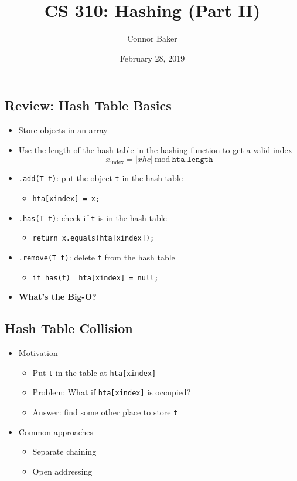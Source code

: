 \documentclass[10pt]{article}
\title{CS 310: Hashing (Part II)}
\author{Connor Baker}
\date{February 28, 2019}
\begin{document}
\maketitle

\subsection*{Review: Hash Table Basics}
\begin{itemize}
    \item Store objects in an array
    \item Use the length of the hash table in the hashing function to get a valid index
    $$ x_\text{index} = |xhc|\ \text{mod}\ \texttt{hta.length}$$
    \item \texttt{.add(T t)}: put the object \texttt{t} in the hash table
    \begin{itemize}
        \item \texttt{hta[xindex] = x;}
    \end{itemize}
    \item \texttt{.has(T t)}: check if \texttt{t} is in the hash table
    \begin{itemize}
        \item \texttt{return x.equals(hta[xindex]);}
    \end{itemize}
    \item \texttt{.remove(T t)}: delete \texttt{t} from the hash table
    \begin{itemize}
        \item \texttt{if has(t) { hta[xindex] = null; }}
    \end{itemize}
    \item \textbf{What's the Big-O?}
\end{itemize}

\subsection*{Hash Table Collision}
\begin{itemize}
    \item Motivation
    \begin{itemize}
        \item Put \texttt{t} in the table at \texttt{hta[xindex]}
        \item Problem: What if \texttt{hta[xindex]} is occupied?
        \item Answer: find some other place to store \texttt{t}
    \end{itemize}
    \item Common approaches
    \begin{itemize}
        \item Separate chaining
        \item Open addressing
    \end{itemize}
\end{itemize}
\end{document}

